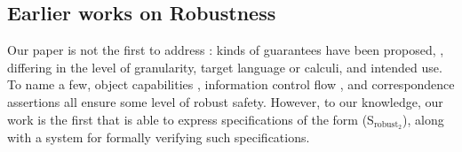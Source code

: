  
 
\vspace{.04in}
 
 \subsection{Earlier works on Robustness} 
Our paper is not the first   to address %
:
 { 
kinds of} guarantees have been proposed,  , differing in the level 
of granularity,   target  language or calculi, and intended use.  {To name a few,}
object capabilities  \cite{MillerPhD, dd, threoremsFreeSep}, 
information control flow \cite{Zdancewic:Myers:01,noninteferenceOS}, 
and correspondence assertions \cite{Maffeis:aiamb:thesis00}
all
ensure some level of robust safety. 
{However, to our knowledge, 
our work is the first that is able to 
express specifications of the form (S$_{\text{robust}_2}$), along with a system
for formally verifying such specifications.}

